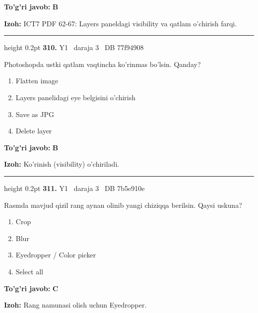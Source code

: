 \documentclass[10pt,a4paper,oneside]{article}
\begin{document}
\begin{tcolorbox}[enhanced,breakable,colback=teal!4,colframe=teal!45!black,boxrule=0.45pt,arc=1.2mm,left=2.8mm,right=2.8mm,top=2mm,bottom=2mm,before skip=2mm,after skip=2mm]
\textbf{\color{teal}To'g'ri javob:} \textbf{B}
\par\smallskip
\textbf{Izoh:} ICT7 PDF 62-67: Layers paneldagi visibility va qatlam o'chirish farqi.
\end{tcolorbox}
\vspace{2mm}\hrule height 0.2pt \vspace{4mm}
\hypertarget{q310}{\textbf{\color{ink}310.}}  {\color{muted}\scriptsize Y1 \textbullet\ daraja 3 \textbullet\ DB 77f94908}
\par
Photoshopda ustki qatlam vaqtincha ko'rinmas bo'lsin. Qanday?
\begin{enumerate}[label=\Alph*),leftmargin=9mm]
\item Flatten image
\item Layers panelidagi eye belgisini o'chirish
\item Save as JPG
\item Delete layer
\end{enumerate}
\begin{tcolorbox}[enhanced,breakable,colback=teal!4,colframe=teal!45!black,boxrule=0.45pt,arc=1.2mm,left=2.8mm,right=2.8mm,top=2mm,bottom=2mm,before skip=2mm,after skip=2mm]
\textbf{\color{teal}To'g'ri javob:} \textbf{B}
\par\smallskip
\textbf{Izoh:} Ko'rinish (visibility) o'chiriladi.
\end{tcolorbox}
\vspace{2mm}\hrule height 0.2pt \vspace{4mm}
\hypertarget{q311}{\textbf{\color{ink}311.}}  {\color{muted}\scriptsize Y1 \textbullet\ daraja 3 \textbullet\ DB 7b5e910e}
\par
Rasmda mavjud qizil rang aynan olinib yangi chiziqqa berilsin. Qaysi uskuna?
\begin{enumerate}[label=\Alph*),leftmargin=9mm]
\item Crop
\item Blur
\item Eyedropper / Color picker
\item Select all
\end{enumerate}
\begin{tcolorbox}[enhanced,breakable,colback=teal!4,colframe=teal!45!black,boxrule=0.45pt,arc=1.2mm,left=2.8mm,right=2.8mm,top=2mm,bottom=2mm,before skip=2mm,after skip=2mm]
\textbf{\color{teal}To'g'ri javob:} \textbf{C}
\par\smallskip
\textbf{Izoh:} Rang namunasi olish uchun Eyedropper.
\end{tcolorbox}
\end{document}
